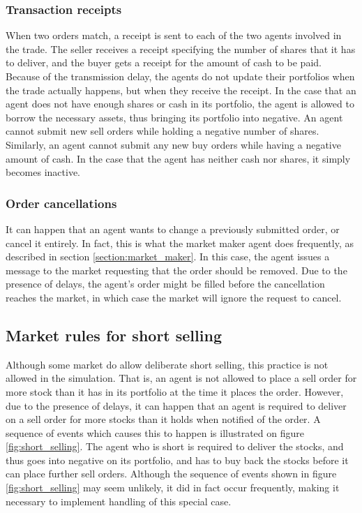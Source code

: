 \subsubsection{Transaction receipts}
When two orders match, a receipt is sent to each of the two agents involved in the trade. The seller receives a receipt specifying the number of shares that it has to deliver, and the buyer gets a receipt for the amount of cash to be paid. Because of the transmission delay, the agents do not update their portfolios when the trade actually happens, but when they receive the receipt. In the case that an agent does not have enough shares or cash in its portfolio, the agent is allowed to borrow the necessary assets, thus bringing its portfolio into negative. An agent cannot submit new sell orders while holding a negative number of shares. Similarly, an agent cannot submit any new buy orders while having a negative amount of cash. In the case that the agent has neither cash nor shares, it simply becomes inactive.

\subsubsection{Order cancellations}
It can happen that an agent wants to change a previously submitted order, or cancel it entirely. In fact, this is what the market maker agent does frequently, as described in section \ref{section:market_maker}. In this case, the agent issues a message to the market requesting that the order should be removed. Due to the presence of delays, the agent's order might be filled before the cancellation reaches the market, in which case the market will ignore the request to cancel.

\subsection{Market rules for short selling}
Although some market do allow deliberate short selling, this practice is not allowed in the simulation. That is, an agent is not allowed to place a sell order for more stock than it has in its portfolio at the time it places the order. However, due to the presence of delays, it can happen that an agent is required to deliver on a sell order for more stocks than it holds when notified of the order. A sequence of events which causes this to happen is  illustrated on figure \ref{fig:short_selling}. The agent who is short is required to deliver the stocks, and thus goes into negative on its portfolio, and has to buy back the stocks before it can place further sell orders. Although the sequence of events shown in figure \ref{fig:short_selling} may seem unlikely, it did in fact occur frequently, making it necessary to implement handling of this special case. 

